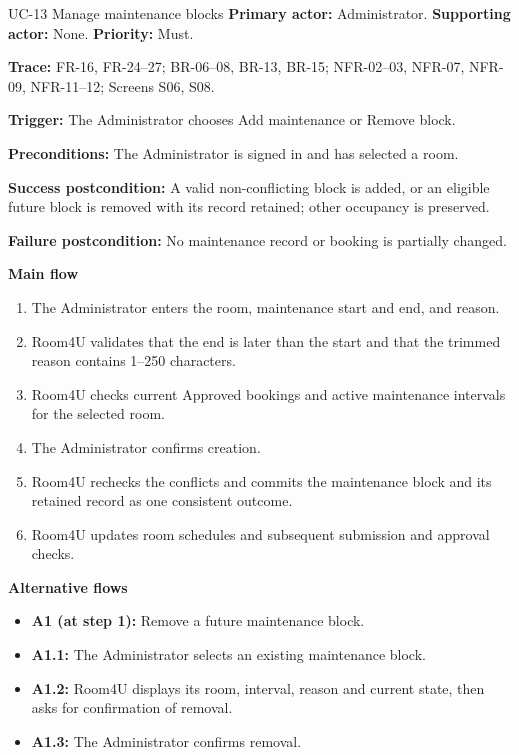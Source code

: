 \begin{usecasebox}{UC-13 Manage maintenance blocks}
\noindent\textbf{Primary actor:} Administrator.\quad
\textbf{Supporting actor:} None.\quad
\textbf{Priority:} Must.\par
\textbf{Trace:} FR-16, FR-24--27; BR-06--08, BR-13, BR-15; NFR-02--03, NFR-07, NFR-09, NFR-11--12; Screens S06, S08.\par
\textbf{Trigger:} The Administrator chooses Add maintenance or Remove block.\par
\textbf{Preconditions:} The Administrator is signed in and has selected a room.\par
\textbf{Success postcondition:} A valid non-conflicting block is added, or an eligible future block is removed with its record retained; other occupancy is preserved.\par
\textbf{Failure postcondition:} No maintenance record or booking is partially changed.\par
\textbf{Main flow}
\begin{enumerate}[label=\arabic*.,leftmargin=2em,itemsep=1pt,topsep=2pt]
  \item The Administrator enters the room, maintenance start and end, and reason.
  \item Room4U validates that the end is later than the start and that the trimmed reason contains 1--250 characters.
  \item Room4U checks current Approved bookings and active maintenance intervals for the selected room.
  \item The Administrator confirms creation.
  \item Room4U rechecks the conflicts and commits the maintenance block and its retained record as one consistent outcome.
  \item Room4U updates room schedules and subsequent submission and approval checks.
\end{enumerate}
\textbf{Alternative flows}
\begin{itemize}[label={},leftmargin=0pt,itemsep=1pt,topsep=1pt]
  \item \textbf{A1 (at step 1):} Remove a future maintenance block.
  \item \textbf{A1.1:} The Administrator selects an existing maintenance block.
  \item \textbf{A1.2:} Room4U displays its room, interval, reason and current state, then asks for confirmation of removal.
  \item \textbf{A1.3:} The Administrator confirms removal.

\end{itemize}
\end{usecasebox}
